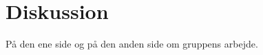 \chapter{Diskussion}\label{kapitel_Diskussion}

På den ene side og på den anden side om gruppens arbejde.
